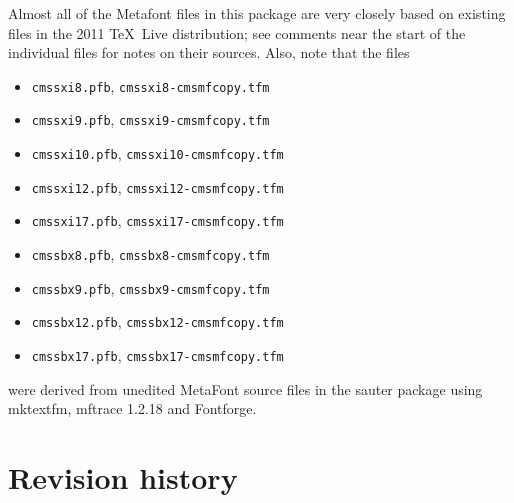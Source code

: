 \documentclass{amsart}
\begin{document}
Almost all of the Metafont files in this package are very closely based on existing files in the 2011 \TeX\ Live distribution; see comments near the start of the individual files for notes on their sources. Also, note that the 
files
\begin{itemize}[leftmargin=*]
\item \texttt{cmssxi8.pfb}, \texttt{cmssxi8-cmsmfcopy.tfm}
\item \texttt{cmssxi9.pfb}, \texttt{cmssxi9-cmsmfcopy.tfm}
\item \texttt{cmssxi10.pfb}, \texttt{cmssxi10-cmsmfcopy.tfm}
\item \texttt{cmssxi12.pfb}, \texttt{cmssxi12-cmsmfcopy.tfm}
\item \texttt{cmssxi17.pfb}, \texttt{cmssxi17-cmsmfcopy.tfm}
\item \texttt{cmssbx8.pfb}, \texttt{cmssbx8-cmsmfcopy.tfm}
\item \texttt{cmssbx9.pfb}, \texttt{cmssbx9-cmsmfcopy.tfm}
\item \texttt{cmssbx12.pfb}, \texttt{cmssbx12-cmsmfcopy.tfm}
\item \texttt{cmssbx17.pfb}, \texttt{cmssbx17-cmsmfcopy.tfm}
\end{itemize}
were derived from unedited MetaFont source files in the \textsf{sauter} package using \textsf{mktextfm}, \textsf{mftrace 1.2.18} and Fontforge. 

\section{Revision history}
\end{document}
